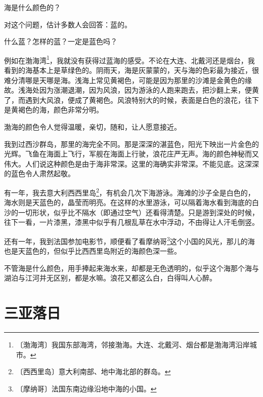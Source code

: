 \documentclass[12pt,UTF-8,openany]{ctexbook}
\begin{document}
\begin{large}
    
    海是什么颜色的？
    
    对这个问题，估计多数人会回答：蓝的。
    
    什么蓝？怎样的蓝？一定是蓝色吗？
    
    例如在渤海湾\footnote{〔渤海湾〕我国东部海湾，邻接渤海。大连、北戴河、烟台都是渤海湾沿岸城市。}，我就没有获得过蓝海的感受。不论在大连、北戴河还是烟台，我看到的海基本上是草绿色的。阴雨天，海是灰蒙蒙的，天与海的色彩最为接近，很难分清哪是天哪是海。浅海上常见黄褐色，可能是因为那里的沙滩是金黄色的缘故。浅海处因为涨潮退潮，因为风浪，因为游泳的人跑来跑去，把沙翻上来，便黄了，而遇到大风浪，便成了黄褐色。风浪特别大的时候，表面是白色的浪花，往下是黄褐色的海，颜色非常分明。
    
    渤海的颜色令人觉得温暖，亲切，随和，让人愿意接近。
    
    我到过西沙群岛，那里的海完全不同。那是深深的湛蓝色，阳光下映出一片金色的光辉。飞鱼在海面上飞行，军舰在海面上行驶，浪花庄严无声。海的颜色神秘而又伟大。人们说这种颜色是由于海非常深。这里的海确实非常深。不能见底。这深深的蓝色令人肃然起敬。
    
    有一年，我去意大利西西里岛\footnote{〔西西里岛〕意大利南部、地中海北部的群岛。}，有机会几次下海游泳。海滩的沙子全是白色的，海水则是天蓝色的，晶莹而明亮。在这样的水里游泳，可以隔着海水看到海底的白沙的一切形状，似乎比不隔水（即通过空气）还看得清楚。只是游到深处的时候，往下一看，一片漆黑，漆黑中似乎有几根乱草在水中浮动，不由得让人汗毛倒竖。
    
    还有一年，我到法国参加电影节，顺便看了看摩纳哥\footnote{〔摩纳哥〕法国东南边缘沿地中海的小国。}这个小国的风光，那儿的海也是天蓝色的，但似乎比西西里岛附近的海颜色深一些。
    
    不管海是什么颜色，用手捧起来海水来，却都是无色透明的，似乎这个海那个海与湖泊与江河并无区别，都是水嘛。浪花又都这么白，白得叫人心醉。
    
\end{large}



\chapter{三亚落日}
\end{document}
